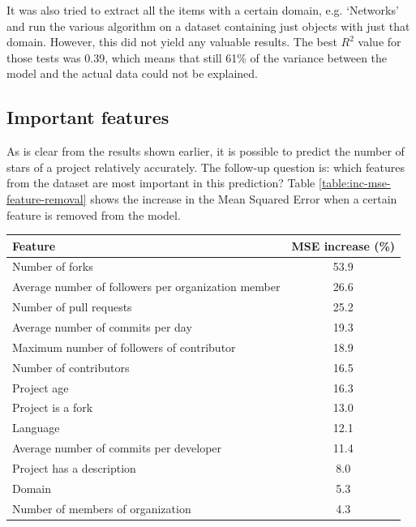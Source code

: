         It was also tried to extract all the items with a certain domain, e.g. `Networks' and run the various algorithm on a dataset containing just objects with just that domain. However, this did not yield any valuable results. 
        The best $R^2$ value for those tests was 0.39, which means that still 61\% of the variance between the model and the actual data could not be explained.
        
    \subsection{Important features}
        As is clear from the results shown earlier, it is possible to predict the number of stars of a project relatively accurately. 
        The follow-up question is: which features from the dataset are most important in this prediction? 
        Table \ref{table:inc-mse-feature-removal} shows the increase in the Mean Squared Error when a certain feature is removed from the model.
        \begin{center}
        \begin{tabular}[width=250pt]{|l|c|}
            \hline
            Feature                                                       & MSE increase (\%) \\
            \hline
                Number of forks                                            & 53.9     \\
                Average number of followers per organization member         & 26.6    \\
                Number of pull requests                                    & 25.2     \\
                Average number of commits per day                          & 19.3     \\
                Maximum number of followers of contributor                 & 18.9                   \\                    
                Number of contributors                                     & 16.5      \\
                Project age                                                &  16.3  \\
                Project is a fork                                          & 13.0      \\
                Language                                                   & 12.1      \\
                Average number of commits per developer                    & 11.4         \\
                Project has a description                                  & 8.0 \\
                Domain                                                     & 5.3 \\
                Number of members of organization                          & 4.3 \\
            \hline
        \end{tabular}
        \label{table:inc-mse-feature-removal}
     \end{center}
     
